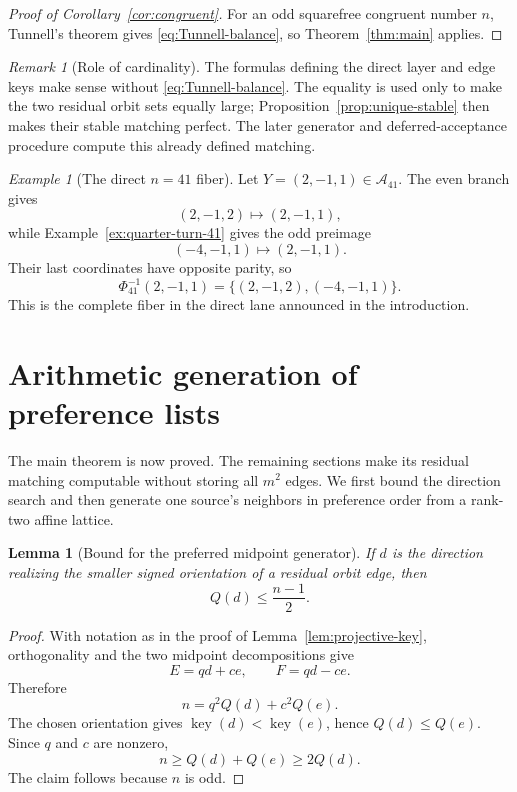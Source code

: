 \documentclass[11pt]{amsart}
\newtheorem{lemma}[theorem]{Lemma}
\theoremstyle{definition}
\theoremstyle{remark}
\newtheorem{remark}[theorem]{Remark}
\newtheorem{example}[theorem]{Example}
\newcommand{\key}{\operatorname{key}}
\begin{document}
\begin{proof}[Proof of Corollary~\ref{cor:congruent}]
For an odd squarefree congruent number $n$, Tunnell's theorem gives
\eqref{eq:Tunnell-balance}, so Theorem~\ref{thm:main} applies.
\end{proof}

\begin{remark}[Role of cardinality]\label{rem:cardinality}
The formulas defining the direct layer and edge keys make sense without
\eqref{eq:Tunnell-balance}.  The equality is used only to make the two residual
orbit sets equally large; Proposition~\ref{prop:unique-stable} then makes their
stable matching perfect.  The later generator and deferred-acceptance
procedure compute this already defined matching.
\end{remark}

\begin{example}[The direct $n=41$ fiber]
\label{ex:fiber-41}
Let $Y=(2,-1,1)\in\mathcal A_{41}$.  The even branch gives
\[
 (2,-1,2)\longmapsto(2,-1,1),
\]
while Example~\ref{ex:quarter-turn-41} gives the odd preimage
\[
 (-4,-1,1)\longmapsto(2,-1,1).
\]
Their last coordinates have opposite parity, so
\[
 \Phi_{41}^{-1}(2,-1,1)
 =\{(2,-1,2),(-4,-1,1)\}.
\]
This is the complete fiber in the direct lane announced in the introduction.
\end{example}

\section{Arithmetic generation of preference lists}\label{sec:affine-stream}

The main theorem is now proved.  The remaining sections make its residual
matching computable without storing all $m^2$ edges.  We first bound the
direction search and then generate one source's neighbors in preference order
from a rank-two affine lattice.

\begin{lemma}[Bound for the preferred midpoint generator]
\label{lem:projective-half-bound}
If $d$ is the direction realizing the smaller signed orientation of a
residual orbit edge, then
\[
 Q(d)\le\frac{n-1}{2}.
\]
\end{lemma}

\begin{proof}
With notation as in the proof of Lemma~\ref{lem:projective-key}, orthogonality
and the two midpoint decompositions give
\[
 E=qd+ce,
 \qquad
 F=qd-ce.
\]
Therefore
\[
 n=q^2Q(d)+c^2Q(e).
\]
The chosen orientation gives $\key(d)<\key(e)$, hence $Q(d)\le Q(e)$.  Since
$q$ and $c$ are nonzero,
\[
 n\ge Q(d)+Q(e)\ge2Q(d).
\]
The claim follows because $n$ is odd.
\end{proof}
\end{document}
